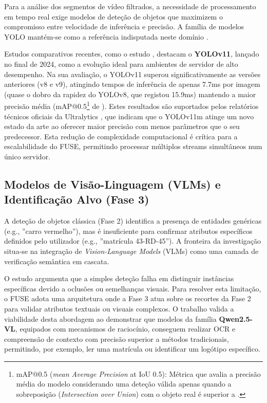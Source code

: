  Para a análise dos segmentos de vídeo filtrados, a necessidade de processamento em tempo real exige modelos de deteção de objetos que maximizem o compromisso entre velocidade de inferência e precisão. A família de modelos \gls{YOLO} mantém-se como a referência indisputada neste domínio \cite{terven_comprehensive_2023}.


Estudos comparativos recentes, como o estudo \cite{khanam_comparative_2025}, destacam o \textbf{YOLOv11}, lançado no final de 2024, como a evolução ideal para ambientes de servidor de alto desempenho. Na sua avaliação, o YOLOv11 superou significativamente as versões anteriores (v8 e v9), atingindo tempos de inferência de apenas 7.7ms por imagem (quase o dobro da rapidez do YOLOv8, que registou 15.9ms) mantendo a maior precisão média (mAP@0.5\footnote{mAP@0.5 (\textit{mean Average Precision} at IoU 0.5): Métrica que avalia a precisão média do modelo considerando uma deteção válida apenas quando a sobreposição (\textit{Intersection over Union}) com o objeto real é superior a .} de ). Estes resultados são suportados pelos relatórios técnicos oficiais da Ultralytics \cite{jocher_ultralytics_2024}, que indicam que o YOLOv11m atinge um novo estado da arte ao oferecer maior precisão com  menos parâmetros que o seu predecessor. Esta redução de complexidade computacional é crítica para a escalabilidade do \gls{FUSE}, permitindo processar múltiplos streams simultâneos num único servidor.

\subsection{Modelos de Visão-Linguagem (\glspl{VLM}) e Identificação Alvo (Fase 3)}
\label{subsec:vlm}

A deteção de objetos clássica (Fase 2) identifica a presença de entidades genéricas (e.g., ''carro vermelho''), mas é insuficiente para confirmar atributos específicos definidos pelo utilizador (e.g., ''matrícula 43-RD-45''). A fronteira da investigação situa-se na integração de \textit{Vision-Language Models} (\glspl{VLM}) como uma camada de verificação semântica em cascata.

O estudo \cite{xia_enhancing_2025} argumenta que a simples deteção falha em distinguir instâncias específicas devido a oclusões ou semelhanças visuais. Para resolver esta limitação, o \gls{FUSE} adota uma arquitetura onde a Fase 3 atua sobre os recortes da Fase 2 para validar atributos textuais ou visuais complexos. O trabalho \cite{bang_reasoning-augmented_2025} valida a viabilidade desta abordagem ao demonstrar que modelos da família \textbf{Qwen2.5-VL}, equipados com mecanismos de raciocínio, conseguem realizar \gls{OCR} e compreensão de contexto com precisão superior a métodos tradicionais, permitindo, por exemplo, ler uma matrícula ou identificar um logótipo específico.

